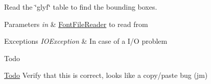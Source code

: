 Read the \char`\"{}glyf\char`\"{} table to find the bounding boxes. 
\begin{DoxyParams}{Parameters}
{\em in} & \mbox{\hyperlink{classorg_1_1newdawn_1_1slick_1_1tools_1_1hiero_1_1truetype_1_1_font_file_reader}{Font\+File\+Reader}} to read from \\
\hline
\end{DoxyParams}

\begin{DoxyExceptions}{Exceptions}
{\em I\+O\+Exception} & In case of a I/O problem \\
\hline
\end{DoxyExceptions}
\begin{DoxyRefDesc}{Todo}
\item[\mbox{\hyperlink{todo__todo000001}{Todo}}]Verify that this is correct, looks like a copy/paste bug (jm) \end{DoxyRefDesc}


